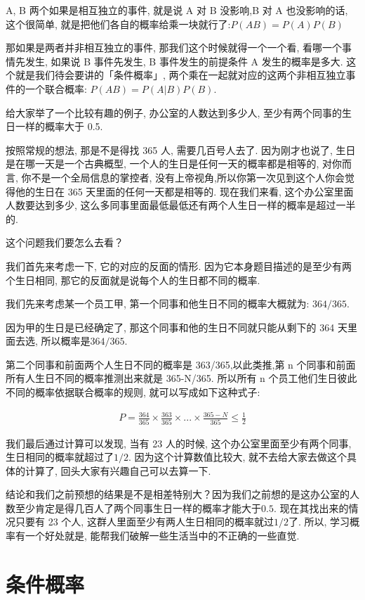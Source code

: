 A, B 两个如果是相互独立的事件, 就是说 A 对 B 没影响,B 对 A 也没影响的话, 这个很简单, 就是把他们各自的概率给乘一块就行了:$P(AB) = P(A)P(B)$

那如果是两者并非相互独立的事件, 那我们这个时候就得一个一个看, 看哪一个事情先发生, 如果说 B 事件先发生, B 事件发生的前提条件 A 发生的概率是多大. 这个就是我们待会要讲的「条件概率」, 两个乘在一起就对应的这两个非相互独立事件的一个联合概率: $P(AB) = P(A|B)P(B)$. 

给大家举了一个比较有趣的例子, 办公室的人数达到多少人, 至少有两个同事的生日一样的概率大于 0.5. 

按照常规的想法, 那是不是得找 365 人, 需要几百号人去了. 因为刚才也说了, 生日是在哪一天是一个古典概型, 一个人的生日是任何一天的概率都是相等的, 对你而言, 你不是一个全局信息的掌控者, 没有上帝视角,所以你第一次见到这个人你会觉得他的生日在 365 天里面的任何一天都是相等的. 现在我们来看, 这个办公室里面人数要达到多少, 这么多同事里面最低最低还有两个人生日一样的概率是超过一半的. 

这个问题我们要怎么去看？

我们首先来考虑一下, 它的对应的反面的情形. 因为它本身题目描述的是至少有两个生日相同, 那它的反面就是说每个人的生日都不同的概率. 

我们先来考虑某一个员工甲, 第一个同事和他生日不同的概率大概就为: $364/365$.

因为甲的生日是已经确定了, 那这个同事和他的生日不同就只能从剩下的 364 天里面去选, 所以概率是$364/365$. 

第二个同事和前面两个人生日不同的概率是 363/365,以此类推,第 n 个同事和前面所有人生日不同的概率推测出来就是 365-N/365. 所以所有 n 个员工他们生日彼此不同的概率依据联合概率的规则, 就可以写成如下这种式子: 

\begin{align*}
  P = \frac{364}{365} \times \frac{363}{365} \times ... \times \frac{365-N}{365} \le \frac{1}{2} 
\end{align*}

我们最后通过计算可以发现, 当有 23 人的时候, 这个办公室里面至少有两个同事, 生日相同的概率就超过了$1/2$. 因为这个计算数值比较大, 就不去给大家去做这个具体的计算了, 回头大家有兴趣自己可以去算一下. 

结论和我们之前预想的结果是不是相差特别大？因为我们之前想的是这办公室的人数至少肯定是得几百人了两个同事生日一样的概率才能大于$0.5$. 现在其找出来的情况只要有 23 个人, 这群人里面至少有两人生日相同的概率就过$1/2$了. 所以, 学习概率有一个好处就是, 能帮我们破解一些生活当中的不正确的一些直觉. 

\section{条件概率}

